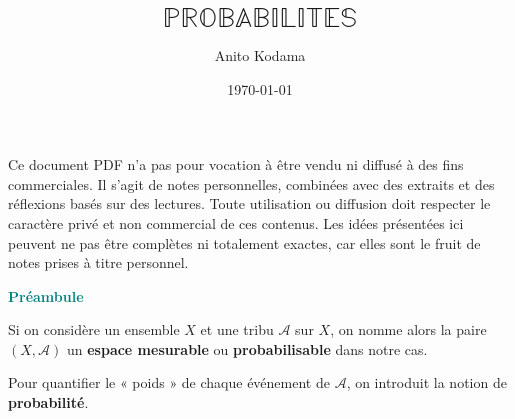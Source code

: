 
\usepackage{emoji}

\usepackage{calligra} %
\title{{\Huge $\mathbb{P}\mathbb{R}\mathbb{O}\mathbb{B}\mathbb{A}\mathbb{B}\mathbb{I}\mathbb{L}\mathbb{I}\mathbb{T}\mathbb{E}\mathbb{S}$}}
\author{Anito Kodama}
\date{\today}




\maketitle

\begin{center}
\begin{minipage}{0.9\textwidth}
\small\ttfamily
Ce document PDF n'a pas pour vocation à être vendu ni diffusé à des fins commerciales. Il s'agit de notes personnelles, combinées avec des extraits et des réflexions basés sur des lectures. Toute utilisation ou diffusion doit respecter le caractère privé et non commercial de ces contenus. Les idées présentées ici peuvent ne pas être complètes ni totalement exactes, car elles sont le fruit de notes prises à titre personnel.
\end{minipage}
\end{center}

\tableofcontents

\newpage
\vspace*{0cm} %
\begin{center}
    \begin{tcolorbox}[parchment] %
        \centering
        {\Huge \textbf{\textcolor{teal}{\calligra Préambule}}}
        \bigskip

        \begin{minipage}{1\textwidth}
            Si on considère un ensemble $X$ et une tribu $\mathcal{A}$ sur $X$, on nomme alors la paire $(X, \mathcal{A})$ un \textbf{espace mesurable} ou \textbf{probabilisable} dans notre cas. \\
            \medskip

            Pour quantifier le « poids » de chaque événement de $\mathcal{A}$, on introduit la notion de \textbf{\large probabilité}.
        \end{minipage}
    \end{tcolorbox}
\end{center}


